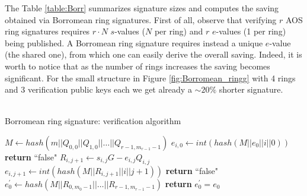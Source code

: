 \begin{center}
	\noindent
	\label{table:Borr}
\end{center}
The Table \ref{table:Borr} summarizes signature sizes and computes the saving obtained via Borromean ring signatures.
First of all, observe that verifying $r$ AOS ring signatures requires $r\cdot N$ $s$-values ($N$ per ring) and $r$ $e$-values (1 per ring) being published. A Borromean ring signature requires instead a unique $e$-value (the shared one), from which one can easily derive the overall saving. Indeed, it is worth to notice that as the number of rings increases the saving becomes significant. For the small structure in Figure \ref{fig:Borromean_ringg} with 4 rings and 3 verification public keys each we get already a $\sim 20\%$ shorter signature.\\ \ \\
\begin{algorithm}[H]
	\caption{Borromean ring signature: verification algorithm}
	\label{alg:Borromean_verify}
	\begin{algorithmic}[1]
		\State $M \gets hash(m||Q_{0,0}||Q_{1,0}||\dots||Q_{r-1,m_{r-1}-1})$
		\State $e_{i,0} \gets int(hash(M||e_0||i||0))$
		\State \textbf{return} ``false"
		\EndIf
		\State $R_{i,j+1} \gets s_{i,j}G - e_{i,j}Q_{i,j}$
		\State $e_{i,j+1} \gets int(hash(M||R_{i,j+1}||i||j+1))$
		\State \textbf{return} ``false"
		\EndIf
		\EndIf
		\EndFor
		\EndFor
		\State $e_0^{'} \gets hash(M||R_{0,m_0-1}||\dots||R_{r-1,m_{r-1}-1})$
		\State \textbf{return} $e_0^{'} = e_0$
		\EndProcedure
	\end{algorithmic}
\end{algorithm}
\noindent

